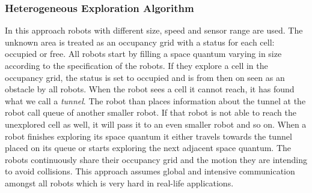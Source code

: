 	\subsubsection{Heterogeneous Exploration Algorithm}
	In this approach robots with different size, speed and sensor range are used.
	The unknown area is treated as an occupancy grid with a status for each cell: occupied or free.
	All robots start by filling a space quantum varying in size according to the specification of the robots.
	If they explore a cell in the occupancy grid, the status is set to occupied and is from then on seen as an obstacle by all robots.
	When the robot sees a cell it cannot reach, it has found what we call a \emph{tunnel}.
	The robot than places information about the tunnel at the robot call queue of another smaller robot.
	If that robot is not able to reach the unexplored cell as well, it will pass it to an even smaller robot and so on.
	When a robot finishes exploring its space quantum it either travels towards the tunnel placed on its queue or starts exploring the next adjacent space quantum.
	The robots continuously share their occupancy grid and the motion they are intending to avoid collisions.
	This approach assumes global and intensive communication amongst all robots which is very hard in real-life applications. \cite{singh1993map}


